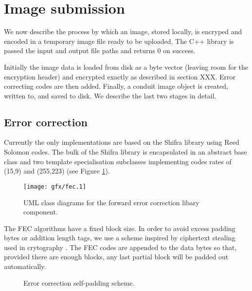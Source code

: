 \FloatBarrier
\section{Image submission}

We now describe the process by which an image, stored locally, is encryped and encoded in a temporary image file ready to be uploaded. The C++ library is passed the input and output file paths and returns 0 on success.

Initially the image data is loaded from disk as a byte vector (leaving room for the encryption header) and encrypted exactly as described in section XXX. Error correcting codes are then added. Finally, a conduit image object is created, written to, and saved to disk. We describe the last two stages in detail.

\FloatBarrier
\subsection{Error correction}

Currently the only implementations are based on the Shifra library using Reed Solomon codes. The bulk of the Shifra library is encapsulated in an abstract base class and two template specialisation subclasses implementing codes rates of (15,9) and (255,223) (see Figure \ref{uml:fec}).


    \begin{figure}[tb]
        \begin{center}
                \texttt{[image: gfx/fec.1]}
            \caption{UML class diagrams for the forward error correction libary component.}
            \label{uml:fec}
        \end{center}
    \end{figure}

The FEC algorithms have a fixed block size. In order to avoid excess padding bytes or addition length tags, we use a scheme inspired by ciphertext stealing used in crytography \cite{XXX}. The FEC codes are appended to the data bytes so that, provided there are enough blocks, any last partial block will be padded out automatically.

\begin{figure}
\begin{center}

    
    
    \caption{Error correction self-padding scheme.}
    \label{tikz:fec}
\end{center}
\end{figure}

